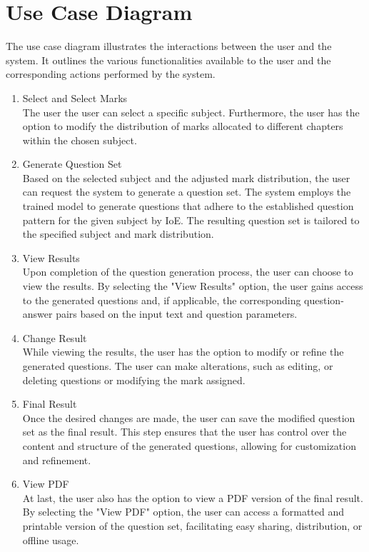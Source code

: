 \documentclass[12pt]{report}
\begin{document}
\section{Use Case Diagram}
The use case diagram illustrates the interactions between the user and the system. It outlines the various functionalities available to the user and the corresponding actions performed by the system.
\begin{enumerate}
    \item {Select and Select Marks\\}
    The user the user can select a specific subject. Furthermore, the user has the option to modify the distribution of marks allocated to different chapters within the chosen subject.
    \item{Generate Question Set\\}
    Based on the selected subject and the adjusted mark distribution, the user can request the system to generate a question set. The system employs the trained model to generate questions that adhere to the established question pattern for the given subject by IoE. The resulting question set is tailored to the specified subject and mark distribution.
    
    \item{View Results\\}
    Upon completion of the question generation process, the user can choose to view the results. By selecting the "View Results" option, the user gains access to the generated questions and, if applicable, the corresponding question-answer pairs based on the input text and question parameters.
    \item Change Result\\
    While viewing the results, the user has the option to modify or refine the generated questions. The user can make alterations, such as editing, or deleting questions or modifying the mark assigned.

    \item Final Result\\
    Once the desired changes are made, the user can save the modified question set as the final result. This step ensures that the user has control over the content and structure of the generated questions, allowing for customization and refinement.

    \item View PDF\\
    At last, the user also has the option to view a PDF version of the final result. By selecting the "View PDF" option, the user can access a formatted and printable version of the question set, facilitating easy sharing, distribution, or offline usage.
\end{enumerate}
\end{document}
